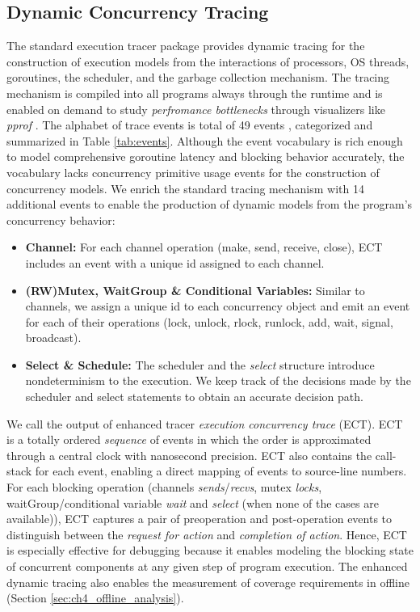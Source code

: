 \subsection{Dynamic Concurrency Tracing}
\label{sec:ch4_dynamic_tracing}
The standard execution tracer package \cite{go-package-trace,go-cmd-trace} provides dynamic tracing for the construction of execution models from the interactions of processors, OS threads, goroutines, the scheduler, and the garbage collection mechanism.
%
The tracing mechanism is compiled into all programs always through the runtime and is enabled on demand to study \textit{perfromance bottlenecks} through visualizers like \textit{pprof} \cite{go-profile-blog}.
%
The alphabet of trace events is total of 49 events \cite{goParserSource}, categorized and summarized in Table \ref{tab:events}.
%
Although the event vocabulary is rich enough to model comprehensive goroutine latency and blocking behavior accurately,
the vocabulary lacks concurrency primitive usage events for the construction of concurrency models.
%
We enrich the standard tracing mechanism with 14 additional events \cite{ect-arxiv} to enable the production of dynamic models from the program's concurrency behavior:
\begin{itemize}
    \item \textbf{Channel:} For each channel operation (make, send, receive, close), ECT includes an event with a unique id assigned to each channel.
    \item \textbf{(RW)Mutex, WaitGroup \& Conditional Variables:} Similar to channels, we assign a unique id to each concurrency object and emit an event for each of their operations (lock, unlock, rlock, runlock, add, wait, signal, broadcast).
    \item \textbf{Select \& Schedule:} The scheduler and the \textit{select} structure introduce nondeterminism to the execution. We keep track of the decisions made by the scheduler and select statements to obtain an accurate decision path.
\end{itemize}

We call the output of enhanced tracer \textit{execution concurrency trace} (ECT).
%
ECT is a totally ordered \textit{sequence} of events in which the order is approximated through a central clock with nanosecond precision.
%
ECT also contains the call-stack for each event, enabling a direct mapping of events to source-line numbers.
%
For each blocking operation (channels \textit{sends}/\textit{recvs}, mutex \textit{locks}, waitGroup/conditional variable \textit{wait} and \textit{select} (when none of the cases are available)), ECT captures a pair of preoperation and post-operation events to distinguish between the \textit{request for action} and \textit{completion of action}.
%
Hence, ECT is especially effective for debugging because it enables modeling the blocking state of concurrent components at any given step of program execution.
%
The enhanced dynamic tracing also enables the measurement of coverage requirements in offline (Section \ref{sec:ch4_offline_analysis}).


